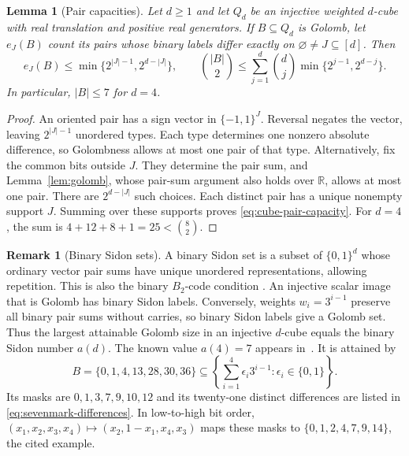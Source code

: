 \documentclass[11pt,a4paper]{article}
\newtheorem{lemma}[theorem]{Lemma}
\theoremstyle{definition}
\newtheorem*{remark}{Remark}
\newcommand{\R}{\mathbb R}
\numberwithin{equation}{section}
\begin{document}
\begin{samepage}
\begin{lemma}[Pair capacities]\label{lem:capacity}
Let $d\ge1$ and let $Q_d$ be an injective weighted $d$-cube with real translation and
positive real generators. If $B\subseteq Q_d$ is Golomb, let $e_J(B)$
count its pairs whose binary labels differ exactly on
$\varnothing\ne J\subseteq[d]$. Then
\begin{equation}\label{eq:cube-pair-capacity}
e_J(B)\le\min\{2^{|J|-1},2^{d-|J|}\},\qquad
\binom{|B|}{2}\le\sum_{j=1}^d\binom dj\min\{2^{j-1},2^{d-j}\}.
\end{equation}
In particular, $|B|\le7$ for $d=4$.
\end{lemma}
\end{samepage}
\begin{proof}
An oriented pair has a sign vector in $\{-1,1\}^J$.
Reversal negates the vector, leaving $2^{|J|-1}$ unordered types.
Each type determines one nonzero absolute difference, so Golombness
allows at most one pair of that type.
Alternatively, fix the common bits outside $J$.
They determine the pair sum, and Lemma~\ref{lem:golomb}, whose
pair-sum argument also holds over $\R$, allows at most one pair.
There are $2^{d-|J|}$ such choices.
Each distinct pair has a unique nonempty support $J$. Summing over these
supports proves \eqref{eq:cube-pair-capacity}. For $d=4$, the sum is
$4+12+8+1=25<\binom82$.
\end{proof}

\begin{remark}[Binary Sidon sets]\label{rem:binary-sidon}
A binary Sidon set is a subset of $\{0,1\}^d$ whose ordinary vector
pair sums have unique unordered representations, allowing repetition.
This is also the binary $B_2$-code condition
\cite{Wood05,CohenLZ01,DellaDalai22}.
An injective scalar image that is Golomb has binary Sidon labels.
Conversely, weights $w_i=3^{i-1}$ preserve all binary pair sums without
carries, so binary Sidon labels give a Golomb set.
Thus the largest attainable Golomb size in an injective $d$-cube
equals the binary Sidon number $a(d)$.
The known value $a(4)=7$ appears in~\cite{OEIS309370}.
It is attained by
\begin{equation}\label{eq:sevenmark-witness}
B=\{0,1,4,13,28,30,36\}
\subseteq\left\{\sum_{i=1}^4\epsilon_i3^{i-1}:\epsilon_i\in\{0,1\}\right\}.
\end{equation}
Its masks are $0,1,3,7,9,10,12$ and its twenty-one distinct
differences are listed in \eqref{eq:sevenmark-differences}.
In low-to-high bit order,
$(x_1,x_2,x_3,x_4)\mapsto(x_2,1-x_1,x_4,x_3)$ maps these masks to
$\{0,1,2,4,7,9,14\}$, the cited example.
\end{remark}
\end{document}
